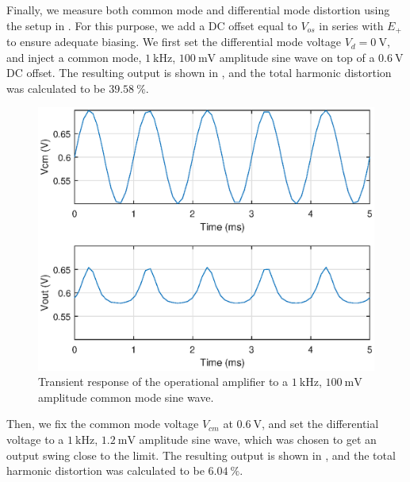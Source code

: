 \documentclass[journal,hidelinks]{IEEEtran}
\begin{document}
Finally, we measure both common mode and differential mode distortion using the setup in . For this purpose, we add a DC offset equal to $V_{os}$ in series with $E_+$ to ensure adequate biasing. We first set the differential mode voltage $V_d = \SI{0}{\volt}$, and inject a common mode, $\SI{1}{\kilo\hertz}$, $\SI{100}{\milli\volt}$ amplitude sine wave on top of a $\SI{0.6}{\volt}$ DC offset. The resulting output is shown in , and the total harmonic distortion was calculated to be $\SI{39.58}{\percent}$.

\begin{figure}[!htb]
  \centering
  \includegraphics[width=\columnwidth]{tran_dist_cm.eps}
  \caption{Transient response of the operational amplifier to a $\SI{1}{\kilo\hertz}$, $\SI{100}{\milli\volt}$ amplitude common mode sine wave.}
  \label{fig:tran_dist_cm}
\end{figure}

Then, we fix the common mode voltage $V_{cm}$ at $\SI{0.6}{\volt}$, and set the differential voltage to a $\SI{1}{\kilo\hertz}$, $\SI{1.2}{\milli\volt}$ amplitude sine wave, which was chosen to get an output swing close to the limit. The resulting output is shown in , and the total harmonic distortion was calculated to be $\SI{6.04}{\percent}$.
\end{document}
